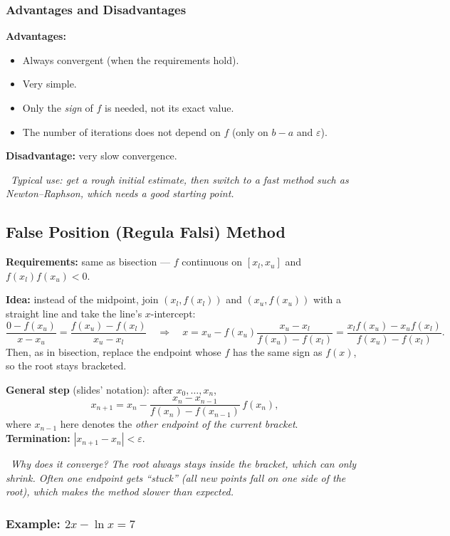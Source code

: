 \documentclass[hidelinks]{article}
\newcommand{\callout}[1]{\par\smallskip\noindent{\color{capri}$\blacktriangleright$}\ \textit{#1}\par\smallskip}
\newcommand{\abs}[1]{\left|#1\right|}
\begin{document}
\subsubsection{Advantages and Disadvantages}

\textbf{Advantages:}
\begin{itemize}
    \item Always convergent (when the requirements hold).
    \item Very simple.
    \item Only the \emph{sign} of $f$ is needed, not its exact value.
    \item The number of iterations does not depend on $f$ (only on $b-a$ and $\varepsilon$).
\end{itemize}
\textbf{Disadvantage:} very slow convergence.

\callout{Typical use: get a rough initial estimate, then switch to a fast method such as Newton--Raphson, which needs a good starting point.}

\subsection{False Position (Regula Falsi) Method}

\textbf{Requirements:} same as bisection --- $f$ continuous on $[x_l,x_u]$ and $f(x_l)f(x_u)<0$.

\textbf{Idea:} instead of the midpoint, join $(x_l,f(x_l))$ and $(x_u,f(x_u))$ with a straight line and take the line's $x$-intercept:
\[
\frac{0-f(x_u)}{x-x_u}=\frac{f(x_u)-f(x_l)}{x_u-x_l}
\quad\Longrightarrow\quad
x=x_u-f(x_u)\frac{x_u-x_l}{f(x_u)-f(x_l)}=\frac{x_l f(x_u)-x_u f(x_l)}{f(x_u)-f(x_l)} .
\]
Then, as in bisection, replace the endpoint whose $f$ has the same sign as $f(x)$, so the root stays bracketed.

\textbf{General step} (slides' notation): after $x_0,\dots,x_n$,
\[
x_{n+1}=x_n-\frac{x_n-x_{n-1}}{f(x_n)-f(x_{n-1})}\,f(x_n),
\]
where $x_{n-1}$ here denotes the \emph{other endpoint of the current bracket}. \textbf{Termination:} $\abs{x_{n+1}-x_n}<\varepsilon$.

\callout{Why does it converge? The root always stays inside the bracket, which can only shrink. Often one endpoint gets ``stuck'' (all new points fall on one side of the root), which makes the method slower than expected.}

\subsubsection{Example: $2x-\ln x=7$}
\end{document}
